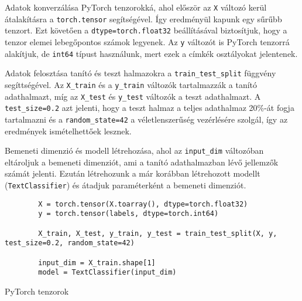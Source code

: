 \begin{flushleft}
    Adatok konverzálása PyTorch tenzorokká, ahol először az \verb|X| változó kerül átalakításra a \verb|torch.tensor| segítségével. Így eredményül kapunk egy sűrűbb tenzort. Ezt követően a \verb|dtype=torch.float32| beállításával biztosítjuk, hogy a tenzor elemei lebegőpontos számok legyenek. Az \verb|y| változót is PyTorch tenzorrá alakítjuk, de \verb|int64| típust használunk, mert ezek a címkék osztályokat jelentenek.
\end{flushleft}
\begin{flushleft}
    Adatok felosztása tanító és teszt halmazokra a \verb|train_test_split| függvény segíttségével. Az \verb|X_train| és a \verb|y_train| változók tartalmazzák a tanító adathalmazt, míg az \verb|X_test| és \verb|y_test| változók a teszt adathalmazt. A \verb|test_size=0.2| azt jelenti, hogy a teszt halmaz a teljes adathalmaz 20\%-át fogja tartalmazni és a \verb|random_state=42| a véletlenszerűség vezérlésére szolgál, így az eredmények ismételhettőek lesznek.
\end{flushleft}
\begin{flushleft}
    Bemeneti dimenzió és modell létrehozása, ahol az \verb|input_dim| változóban eltároljuk a bemeneti dimenziót, ami a tanító adathalmazban lévő jellemzők számát jelenti. Ezután létrehozunk a már korábban létrehozott modellt (\verb|TextClassifier|) és átadjuk paraméterként a bemeneti dimenziót.
\end{flushleft}
\begin{listing}[H]
    \begin{verbatim}
        X = torch.tensor(X.toarray(), dtype=torch.float32)
        y = torch.tensor(labels, dtype=torch.int64)

        X_train, X_test, y_train, y_test = train_test_split(X, y, test_size=0.2, random_state=42)

        input_dim = X_train.shape[1]
        model = TextClassifier(input_dim)
    \end{verbatim}
    \caption{PyTorch tenzorok}
    \label{code:pytensors}
\end{listing}

